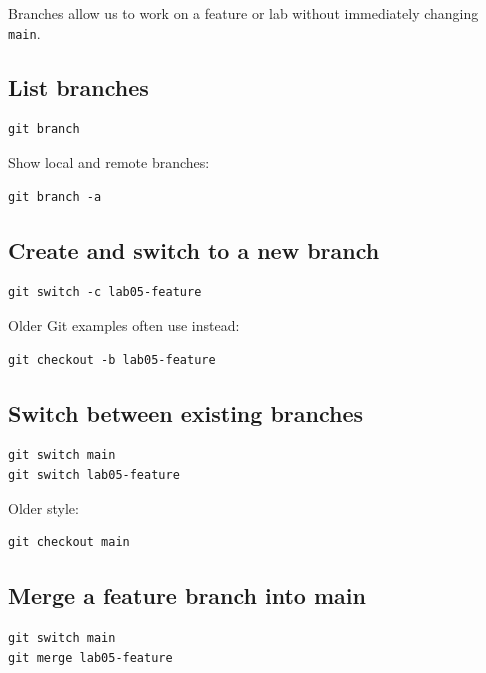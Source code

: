 \documentclass[11pt]{article}
\newcommand{\main}{\texttt{main}}
\begin{document}
Branches allow us to work on a feature or lab without immediately changing \main{}.

\subsection{List branches}

\begin{lstlisting}[style=terminal]
git branch
\end{lstlisting}

Show local and remote branches:

\begin{lstlisting}[style=terminal]
git branch -a
\end{lstlisting}

\subsection{Create and switch to a new branch}

\begin{lstlisting}[style=terminal]
git switch -c lab05-feature
\end{lstlisting}

Older Git examples often use  instead:

\begin{lstlisting}[style=terminal]
git checkout -b lab05-feature
\end{lstlisting}

\subsection{Switch between existing branches}

\begin{lstlisting}[style=terminal]
git switch main
git switch lab05-feature
\end{lstlisting}

Older style:

\begin{lstlisting}[style=terminal]
git checkout main
\end{lstlisting}

\subsection{Merge a feature branch into main}

\begin{lstlisting}[style=terminal]
git switch main
git merge lab05-feature
\end{lstlisting}
\end{document}
